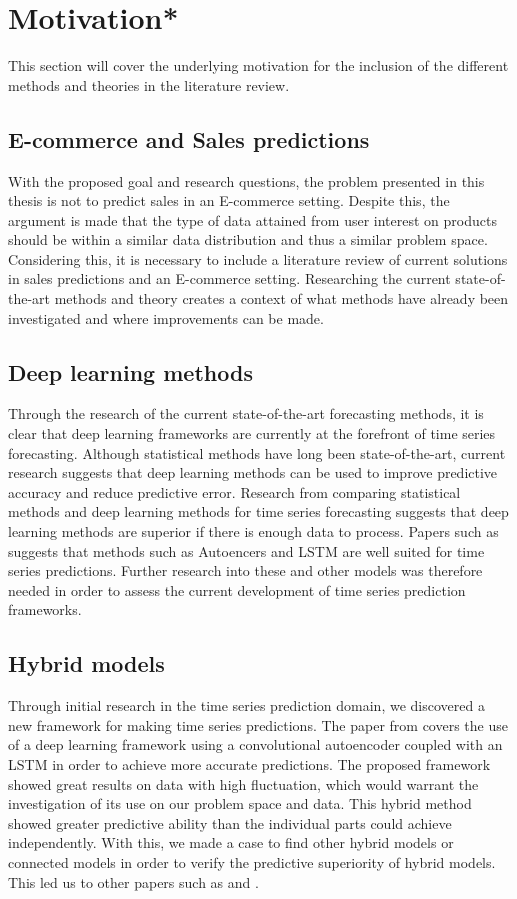 \section{Motivation*}
\label{section:BT:Motivation}

This section will cover the underlying motivation for the inclusion of the different methods and theories in the literature review.


\subsection{E-commerce and Sales predictions}
With the proposed goal and research questions, the problem presented in this thesis is not to predict sales in an E-commerce setting.
Despite this, the argument is made that the type of data attained from user interest on products should be within a similar data distribution and thus a similar problem space.
Considering this, it is necessary to include a literature review of current solutions in sales predictions and an E-commerce setting.
Researching the current state-of-the-art methods and theory creates a context of what methods have already been investigated and where improvements can be made.


\subsection{Deep learning methods}
Through the research of the current state-of-the-art forecasting methods,
it is clear that deep learning frameworks are currently at the forefront of time series forecasting.
Although statistical methods have long been state-of-the-art, current research suggests that deep learning methods can be used to improve predictive accuracy and reduce predictive error.
Research from \cite{Makridakis2018} comparing statistical methods and deep learning methods for time series forecasting suggests that deep learning methods are superior if there is enough data to process.
Papers such as \cite{Laptev} suggests that methods such as Autoencers and LSTM are well suited for time series predictions.
Further research into these and other models was therefore needed in order to assess the current development of time series prediction frameworks.


\subsection{Hybrid models}
Through initial research in the time series prediction domain,
we discovered a new framework for making time series predictions.
The paper from \cite{Zhao2019} covers the use of a deep learning framework using a convolutional autoencoder
coupled with an LSTM in order to achieve more accurate predictions.
The proposed framework showed great results on data with high fluctuation,
which would warrant the investigation of its use on our problem space and data.
This hybrid method showed greater predictive ability than the individual parts could achieve independently.
With this, we made a case to find other hybrid models or connected models in order to verify the predictive superiority of hybrid models.
This led us to other papers such as \cite{Khan2020} and \cite{Bowen2020}.

